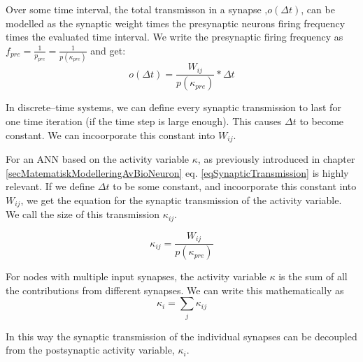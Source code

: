 			Over some time interval, the total transmisson in a synapse ,$o(\Delta t)$, can be modelled as the synaptic weight times the presynaptic neurons firing frequency times the evaluated time interval.
			We write the presynaptic firing frequency as $f_{pre} = \frac{1}{p_{pre}} = \frac{1}{p(\kappa_{pre})}$ and get:
			\begin{equation}
				\label{eqSynapticTransmission}
				o(\Delta t) = \frac{ W_{ij} }{ p(\kappa_{pre})} * \Delta t 
			\end{equation}

			In discrete--time systems, we can define every synaptic transmission to last for one time iteration (if the time step is large enough).  %
			This causes $\Delta t$ to become constant. We can incoorporate this constant into $W_{ij}$.

			For an ANN based on the activity variable $\kappa$, as previously introduced in chapter \ref{secMatematiskModelleringAvBioNeuron} %
			eq. \eqref{eqSynapticTransmission} is highly relevant.  %
			If we define $\Delta t$ to be some constant, and incoorporate this constant into $W_{ij}$, we get the equation for the synaptic transmission of the activity variable.
			We call the size of this transmission $\kappa_{ij}$.

			\begin{equation}
				\label{eqSynapticTransmissionForKANN}
				\kappa_{ij} = \frac{ W_{ij} }{ p(\kappa_{pre})}
			\end{equation}

			For nodes with multiple input synapses, the activity variable $\kappa$ is the sum of all the contributions from different synapses. %
			We can write this mathematically as 
			\begin{equation}
				\label{eqSumOfKij}
				\kappa_i = \sum_j{\kappa_{ij}}
			\end{equation}

			In this way the synaptic transmission of the individual synapses can be decoupled from the postsynaptic activity variable, $\kappa_i$.
			
